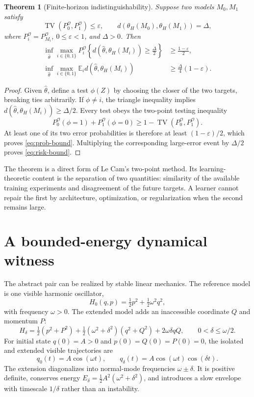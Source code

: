 \documentclass[10pt]{article}
\newtheorem{theorem}{Theorem}
\newcommand{\TV}{\operatorname{TV}}
\newcommand{\E}{\mathbb E}
\begin{document}
\begin{theorem}[Finite-horizon indistinguishability]
Suppose two models $M_0,M_1$ satisfy
\[
\TV(P_0^{\mathcal O},P_1^{\mathcal O})\leq\varepsilon,
\qquad
d(\theta_H(M_0),\theta_H(M_1))=\Delta,
\]
where $P_i^{\mathcal O}=P_{M_i}^{\mathcal O}$, $0\leq\varepsilon<1$, and $\Delta>0$. Then
\begin{align}
\inf_{\widehat\theta}\max_{i\in\{0,1\}}
P_i^{\mathcal O}\!\left\{
d(\widehat\theta,\theta_H(M_i))\geq\frac{\Delta}{2}
\right\}
&\geq\frac{1-\varepsilon}{2}, \label{eq:prob-bound}\\
\inf_{\widehat\theta}\max_{i\in\{0,1\}}
\E_i d(\widehat\theta,\theta_H(M_i))
&\geq\frac{\Delta}{4}(1-\varepsilon). \label{eq:risk-bound}
\end{align}
\end{theorem}

\begin{proof}
Given $\widehat\theta$, define a test $\phi(Z)$ by choosing the closer of the two targets, breaking ties arbitrarily. If $\phi\neq i$, the triangle inequality implies $d(\widehat\theta,\theta_H(M_i))\geq\Delta/2$. Every test obeys the two-point testing inequality
\[
P_0^{\mathcal O}(\phi=1)+P_1^{\mathcal O}(\phi=0)
\geq1-\TV(P_0^{\mathcal O},P_1^{\mathcal O}).
\]
At least one of its two error probabilities is therefore at least $(1-\varepsilon)/2$, which proves \eqref{eq:prob-bound}. Multiplying the corresponding large-error event by $\Delta/2$ proves \eqref{eq:risk-bound}.
\end{proof}

The theorem is a direct form of Le Cam's two-point method. Its learning-theoretic content is the separation of two quantities: similarity of the available training experiments and disagreement of the future targets. A learner cannot repair the first by architecture, optimization, or regularization when the second remains large.

\newpage

\section{A bounded-energy dynamical witness}

The abstract pair can be realized by stable linear mechanics. The reference model is one visible harmonic oscillator,
\[
H_0(q,p)=\tfrac12p^2+\tfrac12\omega^2q^2,
\]
with frequency $\omega>0$. The extended model adds an inaccessible coordinate $Q$ and momentum $P$:
\[
H_\delta=\tfrac12(p^2+P^2)
+\tfrac12(\omega^2+\delta^2)(q^2+Q^2)+2\omega\delta qQ,
\qquad 0<\delta\leq\omega/2.
\]
For initial state $q(0)=A>0$ and $p(0)=Q(0)=P(0)=0$, the isolated and extended visible trajectories are
\[
q_0(t)=A\cos(\omega t),
\qquad
q_\delta(t)=A\cos(\omega t)\cos(\delta t).
\]
The extension diagonalizes into normal-mode frequencies $\omega\pm\delta$. It is positive definite, conserves energy $E_\delta=\tfrac12A^2(\omega^2+\delta^2)$, and introduces a slow envelope with timescale $1/\delta$ rather than an instability.
\end{document}
